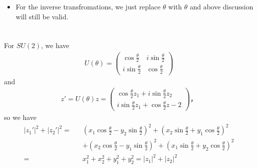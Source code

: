 \documentclass[11pt]{article}
\begin{document}
\begin{itemize}
  \item For the inverse transfromations, we just replace $\theta$ with $\theta$ and above discussion will still be valid.

\end{itemize}

\section{ }
For $SU(2)$, we have
\begin{eqnarray}
  U(\theta)=
  \begin{pmatrix}
    \cos \frac{\theta}{2} & i\sin \frac{\theta}{2} \\
    i\sin \frac{\theta}{2} & \cos \frac{\theta}{2}
  \end{pmatrix}
\end{eqnarray}
and
\begin{eqnarray}
  z'= U(\theta) z = 
  \begin{pmatrix}
    \cos \frac{\theta}{2} z_1 + i\sin \frac{\theta}{2} z_2 \\
    i\sin \frac{\theta}{2} z_1+ \cos \frac{\theta}{2} z-2
  \end{pmatrix}，
\end{eqnarray}
so we have
\begin{eqnarray}
  |z_1'|^2+|z_2'|^2=&&(x_1 \cos \frac{\theta}{2}-y_2 \sin \frac{\theta}{2})^2+(x_2 \sin \frac{\theta}{2} + y_1\cos \frac{\theta}{2} )^2 \nonumber \\
  &&+ (x_2 \cos \frac{\theta}{2}-y_1 \sin \frac{\theta}{2})^2+(x_1 \sin \frac{\theta}{2} + y_2\cos \frac{\theta}{2} )^2\\
  =&& x_1^2+x_2^2+y_1^2+y_2^2=|z_1|^2+|z_2|^2
\end{eqnarray}
\end{document}
